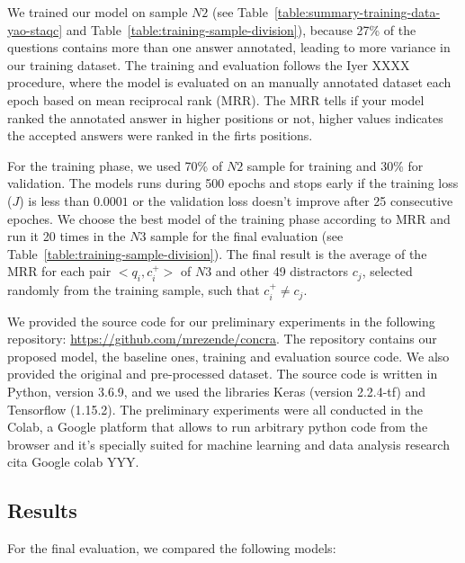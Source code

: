 \documentclass[sigconf]{acmart}
\begin{document}
We trained our model on sample $N2$ (see Table~\ref{table:summary-training-data-yao-staqc} and Table~\ref{table:training-sample-division}), because 27\% of the questions contains more than one answer annotated, leading to more variance in our training dataset. The training and evaluation follows the Iyer XXXX procedure, where the model is evaluated on an manually annotated dataset each epoch based on mean reciprocal rank (MRR). The MRR tells if your model ranked the annotated answer in higher positions or not, higher values indicates the accepted answers were ranked in the firts positions.

For the training phase, we used 70\% of $N2$ sample for training and 30\% for validation. The models runs during 500 epochs and stops early if the training loss ($J$) is less than $0.0001$ or the validation loss doesn't improve after 25 consecutive epoches. We choose the best model of the training phase according to MRR and run it 20 times in the $N3$ sample for the final evaluation (see Table~\ref{table:training-sample-division}). The final result is the average of the MRR for each pair $<q_{i}, c_{i}^{+}>$ of $N3$ and other 49 distractors $c_{j}$, selected randomly from the training sample, such that $c_{i}^{+} \neq c_{j}$.

 We provided the source code for our preliminary experiments in the following repository: \url{https://github.com/mrezende/concra}. The repository contains our proposed model, the baseline ones, training and evaluation source code. We also provided the original and pre-processed dataset. The source code is written in Python, version 3.6.9, and we used the libraries Keras (version 2.2.4-tf) and Tensorflow (1.15.2). The preliminary experiments were all conducted in the Colab, a Google platform that allows to run arbitrary python code from the browser and it's specially suited for machine learning and data analysis research cita Google colab YYY.

\subsection{Results}

For the final evaluation, we compared the following models:
\end{document}

